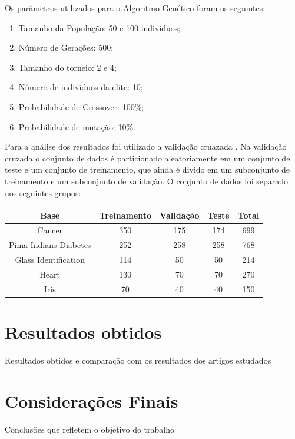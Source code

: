 \documentclass[12pt]{article}
\begin{document}
\par Os parâmetros utilizados para o Algoritmo Genético foram os seguintes:
\begin{enumerate}
	\item Tamanho da População: 50 e 100 indivíduos;
	\item Número de Gerações: 500;
	\item Tamanho do torneio: 2 e 4;
	\item Número de indivíduos da elite: 10;
	\item Probabilidade de Crossover: 100\%;
	\item Probabilidade de mutação: 10\%.
\end{enumerate}

\par Para a análise dos resultados foi utilizado a validação cruazada \cite{Haykin:1998:NNC:521706}. Na validação cruzada o conjunto de dados é particionado aleatoriamente em um conjunto de teste e um conjunto de treinamento, que ainda é divido em um subconjunto de treinamento e um subconjunto de validação. O conjunto de dados foi separado nos seguintes grupos:


\begin{tabular}{|c|c|c|c|c|}
\hline Base & Treinamento & Validação & Teste  & Total \\ 
\hline Cancer & 350 & 175 & 174 & 699 \\ 
\hline Pima Indians Diabetes & 252 & 258 & 258 & 768 \\ 
\hline Glass Identification & 114 & 50 & 50 & 214 \\ 
\hline Heart & 130 & 70 & 70 & 270 \\ 
\hline Iris & 70 & 40 & 40 & 150 \\ 
\hline 
\end{tabular} 

















\section{Resultados obtidos}

Resultados obtidos e comparação com os resultados dos artigos estudados





\section{Considerações Finais}

Conclusões que refletem o objetivo do trabalho




\end{document}
